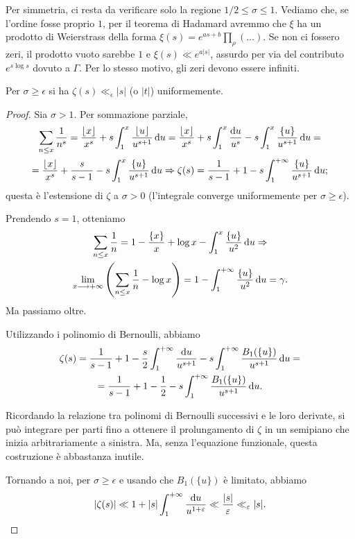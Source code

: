 Per simmetria, ci resta da verificare solo la regione $1/2 \le \sigma \le 1$. Vediamo che, se l'ordine fosse proprio $1$, per il teorema di Hadamard avremmo che $\xi$ ha un prodotto di Weierstrass della forma $\displaystyle \xi(s)=e^{as+b}\prod_{\rho} (\dots)$. Se non ci fossero zeri, il prodotto vuoto sarebbe $1$ e $\xi(s) \ll e^{a|s|}$, assurdo per via del contributo $e^{s\log{s}}$ dovuto a $\Gamma$. Per lo stesso motivo, gli zeri devono essere infiniti.

\begin{lm} \label{lls}
  Per $\sigma \ge \epsilon$ si ha $\zeta(s) \ll_{\epsilon} |s|$ (o $|t|$) uniformemente.
\end{lm}

\begin{proof}
  Sia $\sigma>1$. Per sommazione parziale,
  \begin{gather*}
    \sum_{n \le x} \frac{1}{n^s}=\frac{\lfloor x\rfloor}{x^s}+s\int_1^x \frac{\lfloor u\rfloor}{u^{s+1}}\mathop{}\!\mathrm{d} u=\frac{\lfloor x\rfloor}{x^s}+s\int_1^x \frac{\mathop{}\!\mathrm{d} u}{u^s}-s\int_1^x \frac{\{u\}}{u^{s+1}}\mathop{}\!\mathrm{d} u= \\
    =\frac{\lfloor x\rfloor}{x^s}+\frac{s}{s-1}-s\int_1^x \frac{\{u\}}{u^{s+1}}\mathop{}\!\mathrm{d} u \Rightarrow \zeta(s)=\frac{1}{s-1}+1-s\int_1^{+\infty} \frac{\{u\}}{u^{s+1}}\mathop{}\!\mathrm{d} u;
  \end{gather*}
  questa è l'estensione di $\zeta$ a $\sigma>0$ (l'integrale converge uniformemente per $\sigma \ge \epsilon$).
  \begin{oss}
    Prendendo $s=1$, otteniamo
    \begin{gather*}
      \sum_{n \le x} \frac{1}{n}=1-\frac{\{x\}}{x}+\log{x}-\int_1^x \frac{\{u\}}{u^2}\mathop{}\!\mathrm{d} u \Rightarrow \\
      \lim_{x \longrightarrow +\infty} \left(\sum_{n \le x} \frac{1}{n}-\log{x}\right)=1-\int_1^{+\infty} \frac{\{u\}}{u^2}\mathop{}\!\mathrm{d} u=\gamma.
    \end{gather*}
    Ma passiamo oltre.
  \end{oss}

  Utilizzando i polinomio di Bernoulli, abbiamo
  \begin{gather*}
    \zeta(s)=\frac{1}{s-1}+1-\frac{s}{2}\int_1^{+\infty} \frac{\mathop{}\!\mathrm{d} u}{u^{s+1}}-s\int_1^{+\infty} \frac{B_1(\{u\})}{u^{s+1}}\mathop{}\!\mathrm{d} u= \\
    =\frac{1}{s-1}+1-\frac{1}{2}-s\int_1^{+\infty} \frac{B_1(\{u\})}{u^{s+1}}\mathop{}\!\mathrm{d} u.
  \end{gather*}

  \begin{oss}
    Ricordando la relazione tra polinomi di Bernoulli successivi e le loro derivate, si può integrare per parti fino a ottenere il prolungamento di $\zeta$ in un semipiano che inizia arbitrariamente a sinistra. Ma, senza l'equazione funzionale, questa costruzione è abbastanza inutile.
  \end{oss}

  Tornando a noi, per $\sigma \ge \epsilon$ e usando che $B_1(\{u\})$ è limitato, abbiamo
  $$|\zeta(s)| \ll 1+|s|\int_1^{+\infty} \frac{\mathop{}\!\mathrm{d} u}{u^{1+\varepsilon}} \ll \frac{|s|}{\varepsilon} \ll_{\varepsilon} |s|.$$
\end{proof}

